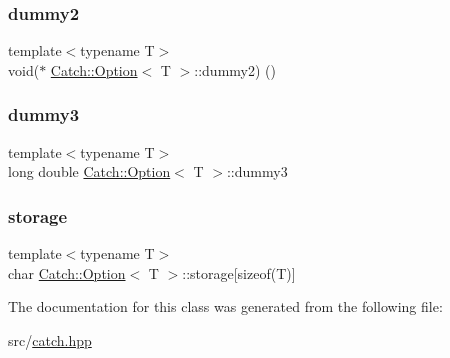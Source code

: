 \mbox{\label{class_catch_1_1_option_afa73c2396b7732932a148b3c889b81d1}} 
\subsubsection{\texorpdfstring{dummy2}{dummy2}}
{\footnotesize\ttfamily template$<$typename T$>$ \\
void($\ast$ \hyperlink{class_catch_1_1_option}{Catch\+::\+Option}$<$ T $>$\+::dummy2) ()}

\mbox{\label{class_catch_1_1_option_a5540a84662093591be496c3a57e9da3f}} 
\subsubsection{\texorpdfstring{dummy3}{dummy3}}
{\footnotesize\ttfamily template$<$typename T$>$ \\
long double \hyperlink{class_catch_1_1_option}{Catch\+::\+Option}$<$ T $>$\+::dummy3}

\mbox{\label{class_catch_1_1_option_acdebca1b18bb8542c3f676b8dd805f23}} 
\subsubsection{\texorpdfstring{storage}{storage}}
{\footnotesize\ttfamily template$<$typename T$>$ \\
char \hyperlink{class_catch_1_1_option}{Catch\+::\+Option}$<$ T $>$\+::storage\mbox{[}sizeof(T)\mbox{]}}



The documentation for this class was generated from the following file\+:\begin{DoxyCompactItemize}
\item 
src/\hyperlink{catch_8hpp}{catch.\+hpp}\end{DoxyCompactItemize}

